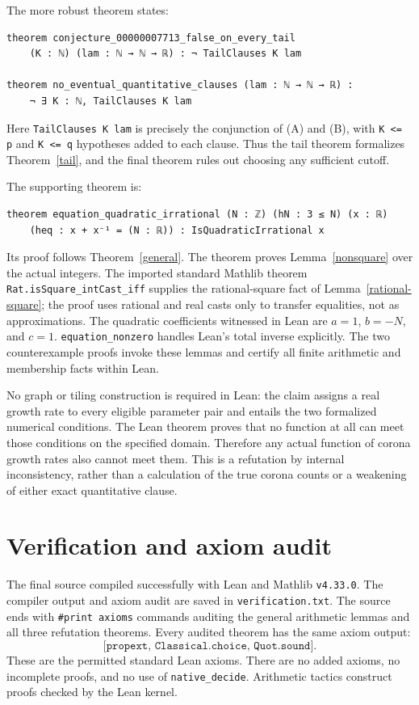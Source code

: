 \documentclass[11pt]{article}
\begin{document}
The more robust theorem states:
\begin{lstlisting}
theorem conjecture_00000007713_false_on_every_tail
    (K : ℕ) (lam : ℕ → ℕ → ℝ) : ¬ TailClauses K lam

theorem no_eventual_quantitative_clauses (lam : ℕ → ℕ → ℝ) :
    ¬ ∃ K : ℕ, TailClauses K lam
\end{lstlisting}
Here \texttt{TailClauses K lam} is precisely the conjunction of (A) and (B),
with \texttt{K <= p} and \texttt{K <= q} hypotheses added to each clause.
Thus the tail theorem formalizes Theorem~\ref{tail}, and the final theorem
rules out choosing any sufficient cutoff.

The supporting theorem is:
\begin{lstlisting}
theorem equation_quadratic_irrational (N : ℤ) (hN : 3 ≤ N) (x : ℝ)
    (heq : x + x⁻¹ = (N : ℝ)) : IsQuadraticIrrational x
\end{lstlisting}
Its proof follows Theorem~\ref{general}. The theorem
 proves Lemma~\ref{nonsquare} over the actual
integers. The imported standard Mathlib theorem
\texttt{Rat.isSquare\_intCast\_iff} supplies the rational-square fact of
Lemma~\ref{rational-square}; the proof uses rational and real casts only to
transfer equalities, not as approximations. The quadratic coefficients
witnessed in Lean are $a=1$, $b=-N$, and $c=1$.
\texttt{equation\_nonzero} handles Lean's total inverse explicitly.
The two counterexample proofs invoke these lemmas and certify all finite
arithmetic and membership facts within Lean.

No graph or tiling construction is required in Lean: the claim assigns a
real growth rate to every eligible parameter pair and entails the two
formalized numerical conditions. The Lean theorem proves that no function
at all can meet those conditions on the specified domain. Therefore any
actual function of corona growth rates also cannot meet them. This is a
refutation by internal inconsistency, rather than a calculation of the true
corona counts or a weakening of either exact quantitative clause.

\section{Verification and axiom audit}
The final source compiled successfully with Lean and Mathlib \texttt{v4.33.0}.
The compiler output and axiom audit are saved in \texttt{verification.txt}.
The source ends with \texttt{\#print axioms} commands auditing the general
arithmetic lemmas and all three refutation theorems. Every audited theorem
has the same axiom output:
\[
\texttt{[propext, Classical.choice, Quot.sound]}.
\]
These are the permitted standard Lean axioms. There are no added axioms,
no incomplete proofs, and no use of \texttt{native\_decide}. Arithmetic tactics
construct proofs checked by the Lean kernel.
\end{document}
